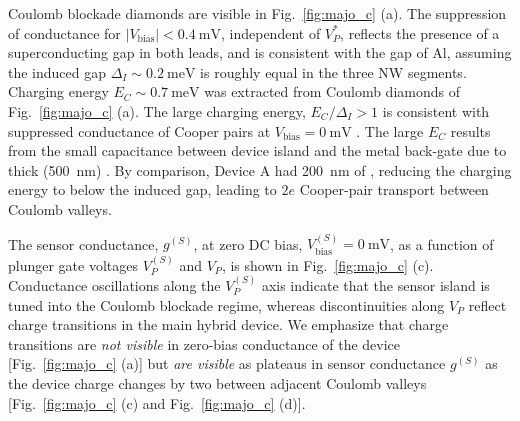 Coulomb blockade diamonds are visible in Fig.~\ref{fig:majo_c} (a). The suppression of conductance for $|V_\textrm{bias}| < \SI{0.4}{\milli\volt}$, independent of $V_{P}^{*}$, reflects the presence of a superconducting gap in both leads, and is consistent with the gap of Al, assuming the induced gap $\Delta_I \sim \SI{0.2}{\meV}$ is roughly equal in the three NW segments. Charging energy $E_C \sim \SI{0.7}{\meV}$ was extracted from Coulomb diamonds of Fig.~\ref{fig:majo_c} (a). The large charging energy, $E_C/\Delta_I > 1$ is consistent with suppressed conductance of Cooper pairs at $V_\textrm{bias} = \SI{0}{\milli\volt}$ \cite{Joyez1994, Matveev1993, Lotkhov2003}. The large $E_C$ results from the small capacitance between device island and the metal back-gate due to thick (\SI{500}{\nano\meter}) . By comparison, Device A had \SI{200}{\nano\meter} of , reducing the charging energy to below the induced gap, leading to $2e$ Cooper-pair transport between Coulomb valleys.

The sensor conductance, $g^{(S)}$, at zero DC bias, $V_\textrm{bias}^{(S)} = \SI{0}{\milli\volt}$, as a function of plunger gate voltages $V_{P}^{(S)}$ and $V_{P}$, is shown in Fig.~\ref{fig:majo_c} (c). Conductance oscillations along the $V_{P}^{(S)}$ axis indicate that the sensor island is tuned into the Coulomb blockade regime, whereas discontinuities along $V_{P}$ reflect charge transitions in the main hybrid device. We emphasize that charge transitions are \emph{not visible} in zero-bias conductance of the device [Fig.~\ref{fig:majo_c} (a)] but \emph{are visible} as plateaus in sensor conductance $g^{(S)}$ as the device charge changes by two between adjacent Coulomb valleys [Fig.~\ref{fig:majo_c} (c) and Fig.~\ref{fig:majo_c} (d)].

